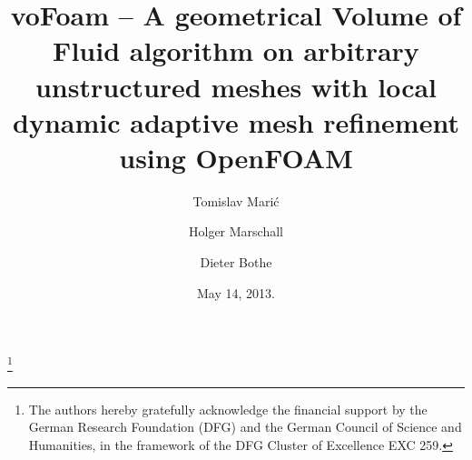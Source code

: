 \documentclass[a4paper,twoside]{amsproc}%
\numberwithin{equation}{section}
\begin{document}
\title[voFoam -- geometrical unsplit VoF algorithm on unstructered meshes]{voFoam -- A geometrical Volume of Fluid algorithm on arbitrary unstructured meshes with local dynamic adaptive mesh refinement using OpenFOAM}

\author{Tomislav Mari\'{c}}
\address{Mathematical Modeling and Analysis Group, Center of Smart Interfaces, Technische \mbox{Universit{\"a}t} Darmstadt, Germany}
\thanks{The authors hereby gratefully acknowledge the financial support by the German Research Foundation (DFG) and the German Council of Science and Humanities, in the framework of the DFG Cluster of Excellence EXC 259.}

\author{Holger Marschall}
\address{Mathematical Modeling and Analysis Group, Center of Smart Interfaces, Technische \mbox{Universit{\"a}t} Darmstadt, Germany}

\author{Dieter Bothe}
\address{Mathematical Modeling and Analysis Group, Center of Smart Interfaces, Technische \mbox{Universit{\"a}t} Darmstadt, Germany}

\date{May 14, 2013.}






\end{document}
